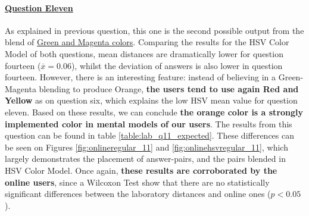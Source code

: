 \paragraph{\ul{Question Eleven}}
%
As explained in previous question, this one is the second possible output from the blend of \ul{Green and Magenta colors}. Comparing the results
for the HSV Color Model of both questions, mean distances are dramatically lower for question fourteen ($\overline{x} = 0.06$), whilst the deviation of answers is also lower in question fourteen.
However, there is an interesting feature: instead of believing in a Green-Magenta blending to produce Orange, \textbf{the users tend to use again Red and Yellow} as on question six,
which explains the low HSV mean value for question eleven.
%
Based on these results, we can conclude \textbf{the orange color is a strongly implemented color in mental models of our users}. The results from this question can be found in table
\ref{table:lab_q11_expected}. These differences can be seen on Figures \ref{fig:onlineregular_11} and \ref{fig:onlinehsvregular_11}, which largely demonstrates the placement of
answer-pairs, and the pairs blended in HSV Color Model.
Once again, \textbf{these results are corroborated by the online users}, since a Wilcoxon Test show that there are no statistically significant differences between the laboratory
distances and online ones ($p < 0.05$).
%
